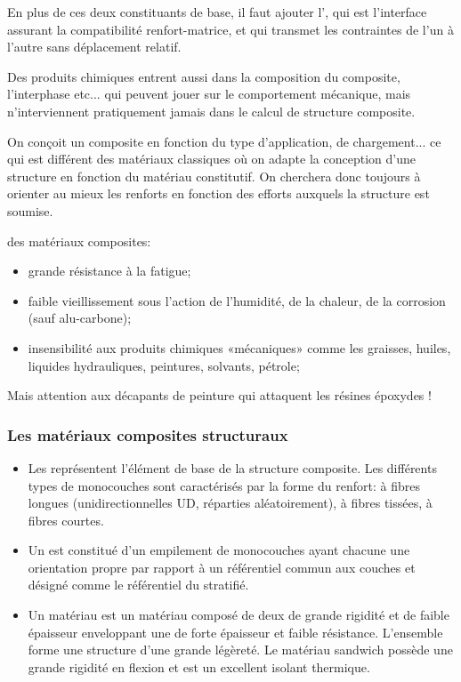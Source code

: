 \medskip
En plus de ces deux constituants de base, il faut ajouter l', qui est l'interface assurant la compatibilité renfort-matrice, et qui transmet les contraintes de l'un à l'autre sans  déplacement relatif.

\medskip
Des produits chimiques entrent aussi dans la composition du composite, l'interphase etc... qui peuvent jouer sur le comportement mécanique, mais n'interviennent pratiquement jamais dans le calcul de structure composite.

\begin{remarque}
On conçoit un composite en fonction du type d'application, de chargement... ce qui est différent des matériaux classiques où on adapte la conception d'une structure en fonction du matériau constitutif. On cherchera donc toujours à orienter au mieux les renforts en fonction des efforts auxquels la structure est soumise.
\end{remarque}

\medskip
{} des matériaux composites:
\begin{itemize}
	\item grande résistance à la fatigue;
	\item faible vieillissement sous l'action de l'humidité, de la chaleur, de la corrosion (sauf alu-carbone);
	\item insensibilité aux produits chimiques «mécaniques» comme les graisses, huiles, liquides hydrauliques, peintures, solvants, pétrole;
\end{itemize}
Mais attention aux décapants de peinture qui attaquent les résines époxydes !


\medskip
\subsubsection{Les matériaux composites structuraux}

\begin{itemize}
	\item Les  représentent l'élément de base de la structure composite. Les différents types de monocouches sont caractérisés par la forme du renfort:
		 à fibres longues (unidirectionnelles UD, réparties aléatoirement), à fibres tissées, à fibres courtes.
	\item Un  est constitué d'un empilement de monocouches ayant chacune une orientation propre par rapport à un référentiel commun aux couches et désigné comme le référentiel du stratifié.
	\item Un matériau  est un matériau composé de deux  de grande rigidité et de faible épaisseur enveloppant une  de forte épaisseur et faible résistance.
		L'ensemble forme une structure d'une grande légèreté.
		Le matériau sandwich possède une grande rigidité en flexion et est un excellent isolant thermique.
\end{itemize}

